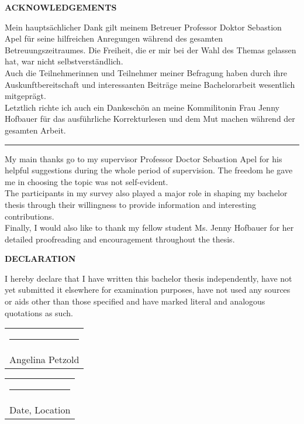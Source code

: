 {	\textbf{\centering ACKNOWLEDGEMENTS}
	\vspace*{\fill}

	Mein hauptsächlicher Dank gilt meinem Betreuer Professor Doktor Sebastion Apel für seine hilfreichen Anregungen während des gesamten Betreuungszeitraumes. Die Freiheit, die er mir bei der Wahl des Themas gelassen hat, war nicht selbstverständlich.
	\newline \\
	Auch die Teilnehmerinnen und Teilnehmer meiner Befragung haben durch ihre Auskunftbereitschaft und interessanten Beiträge meine Bachelorarbeit wesentlich mitgeprägt.
	\newline \\
	Letztlich richte ich auch ein Dankeschön an meine Kommilitonin  Frau Jenny Hofbauer für das ausführliche Korrekturlesen und dem Mut machen während der gesamten Arbeit.
	
	\vspace{1cm}
	\noindent\hfil\rule{0.5\textwidth}{.4pt}\hfil
	\vspace{1cm}
	
	My main thanks go to my supervisor Professor Doctor Sebastion Apel for his helpful suggestions during the whole period of supervision. The freedom he gave me in choosing the topic was not self-evident.
	\newline \\
	The participants in my survey also played a major role in shaping my bachelor thesis through their willingness to provide information and interesting contributions.
	\newline \\
	Finally, I would also like to thank my fellow student Ms. Jenny Hofbauer for her detailed proofreading and encouragement throughout the thesis.
	\vspace*{\fill}
	\pagebreak

	\large
	\leavevmode%
	\vspace*{\fill}
	\begin{center}
		\textbf{DECLARATION}
	\end{center}
			I hereby declare that I have written this bachelor thesis independently, have not yet submitted it elsewhere for examination purposes, have not used any sources or aids other than those specified and have marked literal and analogous quotations as such.
	
	\vspace*{4em}\noindent
	\hfill%
	\begin{tabular}[t]{c}
		\rule{10em}{0.4pt}\\ Angelina Petzold
	\end{tabular}%
	\hfill%
	\begin{tabular}[t]{c}
		\rule{10em}{0.4pt}\\ Date, Location
	\end{tabular}%
	\hfill\strut
	\vspace*{\fill}

	\pagebreak

\par}